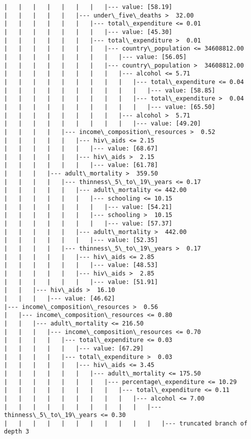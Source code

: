 \documentclass[11pt]{article}
\begin{document}
\begin{Verbatim}[commandchars=\\\{\}]
|   |   |   |   |   |   |   |--- value: [58.19]
|   |   |   |   |   |--- under\_five\_deaths >  32.00
|   |   |   |   |   |   |--- total\_expenditure <= 0.01
|   |   |   |   |   |   |   |--- value: [45.30]
|   |   |   |   |   |   |--- total\_expenditure >  0.01
|   |   |   |   |   |   |   |--- country\_population <= 34608812.00
|   |   |   |   |   |   |   |   |--- value: [56.05]
|   |   |   |   |   |   |   |--- country\_population >  34608812.00
|   |   |   |   |   |   |   |   |--- alcohol <= 5.71
|   |   |   |   |   |   |   |   |   |--- total\_expenditure <= 0.04
|   |   |   |   |   |   |   |   |   |   |--- value: [58.85]
|   |   |   |   |   |   |   |   |   |--- total\_expenditure >  0.04
|   |   |   |   |   |   |   |   |   |   |--- value: [65.50]
|   |   |   |   |   |   |   |   |--- alcohol >  5.71
|   |   |   |   |   |   |   |   |   |--- value: [49.20]
|   |   |   |   |--- income\_composition\_resources >  0.52
|   |   |   |   |   |--- hiv\_aids <= 2.15
|   |   |   |   |   |   |--- value: [68.67]
|   |   |   |   |   |--- hiv\_aids >  2.15
|   |   |   |   |   |   |--- value: [61.78]
|   |   |   |--- adult\_mortality >  359.50
|   |   |   |   |--- thinness\_5\_to\_19\_years <= 0.17
|   |   |   |   |   |--- adult\_mortality <= 442.00
|   |   |   |   |   |   |--- schooling <= 10.15
|   |   |   |   |   |   |   |--- value: [54.21]
|   |   |   |   |   |   |--- schooling >  10.15
|   |   |   |   |   |   |   |--- value: [57.37]
|   |   |   |   |   |--- adult\_mortality >  442.00
|   |   |   |   |   |   |--- value: [52.35]
|   |   |   |   |--- thinness\_5\_to\_19\_years >  0.17
|   |   |   |   |   |--- hiv\_aids <= 2.85
|   |   |   |   |   |   |--- value: [48.53]
|   |   |   |   |   |--- hiv\_aids >  2.85
|   |   |   |   |   |   |--- value: [51.91]
|   |   |--- hiv\_aids >  16.10
|   |   |   |--- value: [46.62]
|--- income\_composition\_resources >  0.56
|   |--- income\_composition\_resources <= 0.80
|   |   |--- adult\_mortality <= 216.50
|   |   |   |--- income\_composition\_resources <= 0.70
|   |   |   |   |--- total\_expenditure <= 0.03
|   |   |   |   |   |--- value: [67.29]
|   |   |   |   |--- total\_expenditure >  0.03
|   |   |   |   |   |--- hiv\_aids <= 3.45
|   |   |   |   |   |   |--- adult\_mortality <= 175.50
|   |   |   |   |   |   |   |--- percentage\_expenditure <= 10.29
|   |   |   |   |   |   |   |   |--- total\_expenditure <= 0.11
|   |   |   |   |   |   |   |   |   |--- alcohol <= 7.00
|   |   |   |   |   |   |   |   |   |   |--- thinness\_5\_to\_19\_years <= 0.30
|   |   |   |   |   |   |   |   |   |   |   |--- truncated branch of depth 3

\end{Verbatim}
\end{document}
